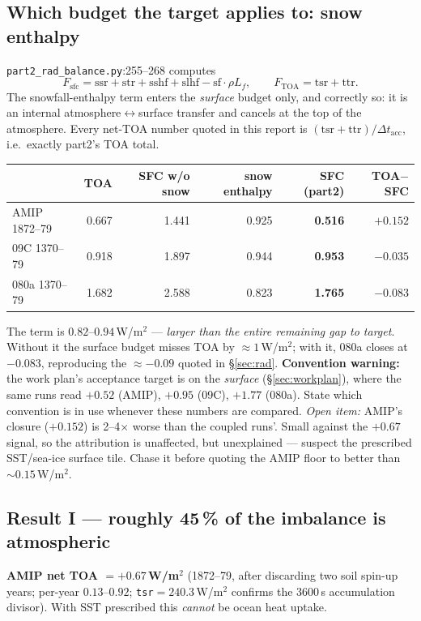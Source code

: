 \documentclass[10pt]{article}
\begin{document}
\subsection{Which budget the target applies to: snow enthalpy}\label{sub:snowenth}
\texttt{part2\_rad\_balance.py}:255--268 computes
\[
F_\mathrm{sfc}=\mathrm{ssr}+\mathrm{str}+\mathrm{sshf}+\mathrm{slhf}-\mathrm{sf}\cdot\rho L_f,
\qquad F_\mathrm{TOA}=\mathrm{tsr}+\mathrm{ttr}.
\]
The snowfall-enthalpy term enters the \emph{surface} budget only, and correctly so: it is an internal
atmosphere$\leftrightarrow$surface transfer and cancels at the top of the atmosphere. Every net-TOA number
quoted in this report is $(\mathrm{tsr}+\mathrm{ttr})/\Delta t_\mathrm{acc}$, i.e.\ exactly part2's TOA total.

\begin{center}\small
\begin{tabular}{l r r r r r}
\toprule
 & TOA & SFC w/o snow & snow enthalpy & SFC (part2) & TOA$-$SFC \\
\midrule
AMIP 1872--79 & 0.667 & 1.441 & 0.925 & \textbf{0.516} & $+0.152$ \\
09C 1370--79  & 0.918 & 1.897 & 0.944 & \textbf{0.953} & $-0.035$ \\
080a 1370--79 & 1.682 & 2.588 & 0.823 & \textbf{1.765} & $-0.083$ \\
\bottomrule
\end{tabular}
\end{center}

The term is $0.82$--$0.94$\,W/m$^2$ --- \emph{larger than the entire remaining gap to target}. Without it the
surface budget misses TOA by $\approx1$\,W/m$^2$; with it, 080a closes at $-0.083$, reproducing the
$\approx-0.09$ quoted in \S\ref{sec:rad}. \textbf{Convention warning:} the work plan's acceptance target is
on the \emph{surface} (\S\ref{sec:workplan}), where the same runs read $+0.52$ (AMIP), $+0.95$ (09C),
$+1.77$ (080a). State which convention is in use whenever these numbers are compared.
\emph{Open item:} AMIP's closure ($+0.152$) is 2--4$\times$ worse than the coupled runs'. Small against the
$+0.67$ signal, so the attribution is unaffected, but unexplained --- suspect the prescribed SST/sea-ice
surface tile. Chase it before quoting the AMIP floor to better than $\sim0.15$\,W/m$^2$.

\subsection{Result I --- roughly 45\,\% of the imbalance is atmospheric}\label{sub:amiptoa}
\textbf{AMIP net TOA $=+0.67$\,W/m$^2$} (1872--79, after discarding two soil spin-up years; per-year
$0.13$--$0.92$; \texttt{tsr}$=240.3$\,W/m$^2$ confirms the 3600\,s accumulation divisor). With SST prescribed
this \emph{cannot} be ocean heat uptake.
\end{document}
